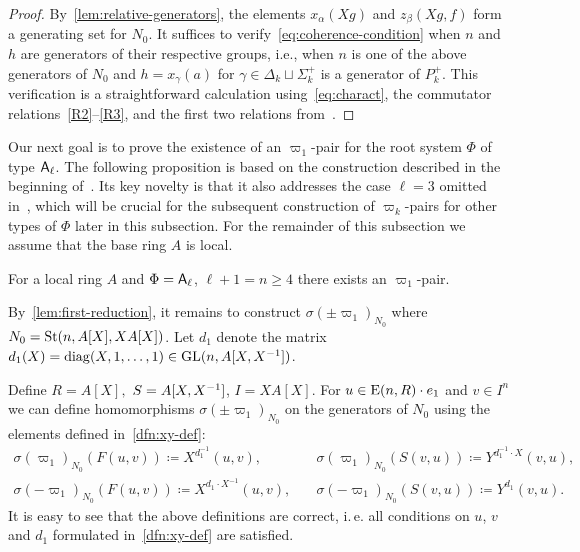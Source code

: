 \begin{proof}
    By~\cref{lem:relative-generators}, the elements $x_\alpha(Xg)$ and $z_\beta(Xg, f)$ form a generating set for \( N_0 \).
    It suffices to verify~\eqref{eq:coherence-condition} when \( n \) and \( h \) are generators of their respective groups,
     i.e., when \( n \) is one of the above generators of \( N_0 \) and \( h = x_\gamma(a) \) for \( \gamma \in \Delta_k \sqcup \Sigma^+_k \) is a generator of \( P_k^+ \).
    This verification is a straightforward calculation using~\eqref{eq:charact}, the commutator relations~\eqref{R2}--\eqref{R3}, and the first two relations from~\cite[Lemma~9]{S15}.
\end{proof}

Our next goal is to prove the existence of an $\varpi_1$-pair for the root system $\Phi$ of type $\mathsf{A}_\ell$.
The following proposition is based on the construction described in the beginning of~\cite[\S~3]{Tu83}.
Its key novelty is that it also addresses the case \( \ell = 3 \) omitted in~\cite{Tu83}, which will be crucial for the subsequent construction of \( \varpi_k \)-pairs for other types of \( \Phi \) later in this subsection.
For the remainder of this subsection we assume that the base ring $A$ is local.

\begin{prop} \label{prop:sigma-construction}
    For a local ring $A$ and $\Phi = \mathsf{A}_\ell$, $\ell + 1 = n \geq 4$ there exists an $\varpi_1$-pair.
\end{prop}

By~\eqref{lem:first-reduction}, it remains to construct $\sigma(\pm\varpi_1)_{N_0}$ where $N_0 = \operatorname{St}(n, A[X], XA[X])$.
Let \( d_1 \) denote the matrix $d_1(X) = \mathrm{diag}(X, 1, \ldots, 1) \in \operatorname{GL}(n, A[X, X^{-1}])$.

Define $R = A[X],$ $S = A[X, X^{-1}]$, $I = XA[X].$
For $u \in \operatorname{E}(n, R) \cdot e_1$ and $v \in I^n$ we can define homomorphisms $\sigma(\pm\varpi_1)_{N_0}$ on the generators of $N_{0}$ using the elements defined in~\cref{dfn:xy-def}:
\begin{align}
    \sigma(\varpi_1)_{N_0} \left(F(u, v)\right) \coloneqq X^{d_1^{-1}}(u, v), & \quad \sigma(\varpi_1)_{N_0} \left(S(v, u)\right) \coloneqq Y^{d_1^{-1} \cdot X}(v, u), \label{eq:def-sigma-1} \\
    \sigma(-\varpi_1)_{N_0} \left(F(u, v)\right) \coloneqq X^{d_1 \cdot X^{-1}}(u, v),& \quad \sigma(-\varpi_1)_{N_0} \left(S(v, u)\right) \coloneqq Y^{d_1}(v, u). \label{eq:def-sigma-2}
\end{align}
It is easy to see that the above definitions are correct, i.\,e. all conditions on $u$, $v$ and $d_1$ formulated in~\cref{dfn:xy-def} are satisfied.

